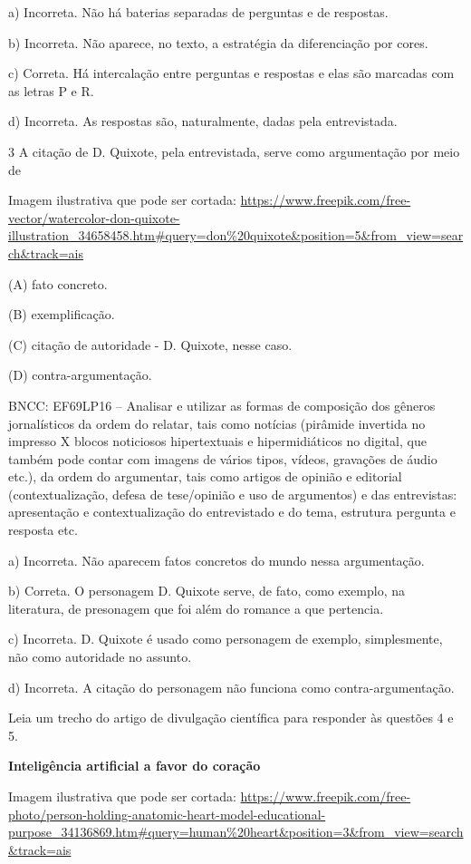 \begin{itemize}
\begin{itemize}
\begin{escolha}
\begin{escolha}
\begin{escolha}
\begin{escolha}
\begin{escolha}
a) Incorreta. Não há baterias separadas de perguntas e de respostas.

b) Incorreta. Não aparece, no texto, a estratégia da diferenciação por
cores.

c) Correta. Há intercalação entre perguntas e respostas e elas são
marcadas com as letras P e R.

d) Incorreta. As respostas são, naturalmente, dadas pela entrevistada.

\num{3} A citação de D. Quixote, pela entrevistada, serve como
argumentação por meio de

Imagem ilustrativa que pode ser cortada:
\url{https://www.freepik.com/free-vector/watercolor-don-quixote-illustration_34658458.htm\#query=don\%20quixote\&position=5\&from_view=search\&track=ais}

(A) fato concreto.

(B) exemplificação.

(C) citação de autoridade - D. Quixote, nesse caso.

(D) contra-argumentação.

BNCC: EF69LP16 -- Analisar e utilizar as formas de composição dos
gêneros jornalísticos da ordem do relatar, tais como notícias (pirâmide
invertida no impresso X blocos noticiosos hipertextuais e
hipermidiáticos no digital, que também pode contar com imagens de vários
tipos, vídeos, gravações de áudio etc.), da ordem do argumentar, tais
como artigos de opinião e editorial (contextualização, defesa de
tese/opinião e uso de argumentos) e das entrevistas: apresentação e
contextualização do entrevistado e do tema, estrutura pergunta e
resposta etc.

a) Incorreta. Não aparecem fatos concretos do mundo nessa argumentação.

b) Correta. O personagem D. Quixote serve, de fato, como exemplo, na
literatura, de presonagem que foi além do romance a que pertencia.

c) Incorreta. D. Quixote é usado como personagem de exemplo,
simplesmente, não como autoridade no assunto.

d) Incorreta. A citação do personagem não funciona como
contra-argumentação.

Leia um trecho do artigo de divulgação científica para responder às
questões 4 e 5.

\textbf{Inteligência artificial a favor do coração}

Imagem ilustrativa que pode ser cortada:
\url{https://www.freepik.com/free-photo/person-holding-anatomic-heart-model-educational-purpose_34136869.htm\#query=human\%20heart\&position=3\&from_view=search\&track=ais}


\end{escolha}
\end{escolha}
\end{escolha}
\end{escolha}
\end{escolha}
\end{itemize}
\end{itemize}
